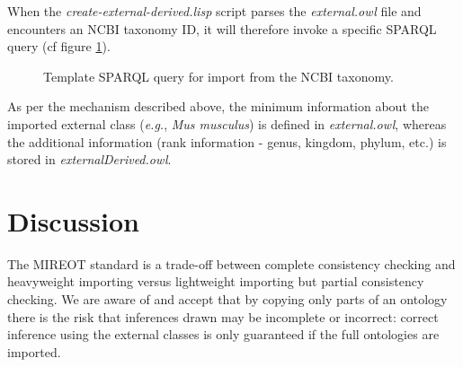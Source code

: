 \documentclass[a4paper,10pt,twocolumn]{article}
\begin{document}
When the \emph{create-external-derived.lisp} script parses the \emph{external.owl} file and encounters an NCBI taxonomy ID, it will therefore invoke a specific SPARQL query (cf figure \ref{fig:sparql2}). 
\begin{figure}[t]
\scriptsize
 
\caption{Template SPARQL query for import from the NCBI taxonomy.}
\label{fig:sparql2}
\end{figure}
As per the mechanism described above, the minimum information about the imported external class (\emph{e.g.}, \emph{Mus musculus}) is defined in \emph{external.owl}, whereas the additional information (rank information - genus, kingdom, phylum, etc.) is stored in \emph{ externalDerived.owl}. 



\section*{Discussion}


The MIREOT standard is a trade-off between complete consistency checking and heavyweight importing versus lightweight importing but partial consistency checking.
We are aware of and accept that by copying only parts of an ontology there is the risk that inferences drawn may be incomplete or incorrect: correct inference using the external classes is only guaranteed if the full ontologies are imported.
\end{document}
